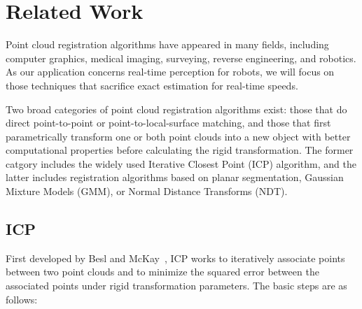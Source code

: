 \documentclass{article} %
\begin{document}


\section{Related Work}

Point cloud registration algorithms have appeared in many fields, including computer graphics, medical imaging, surveying, reverse engineering, and robotics. As our application concerns real-time perception for robots, we will focus on those techniques that sacrifice exact estimation for real-time speeds. 

Two broad categories of point cloud registration algorithms exist: those that do direct point-to-point or point-to-local-surface matching, and those that first parametrically transform one or both point clouds into a new object with better computational properties before calculating the rigid transformation. The former catgory includes the widely used Iterative Closest Point (ICP) algorithm, and the latter includes registration algorithms based on planar segmentation, Gaussian Mixture Models (GMM), or Normal Distance Transforms (NDT). 

\subsection{ICP}

First developed by Besl and McKay~\cite{besl_method_1992}, ICP works to iteratively associate points between two point clouds and to minimize the squared error between the associated points under rigid transformation parameters. The basic steps are as follows:
\end{document}
